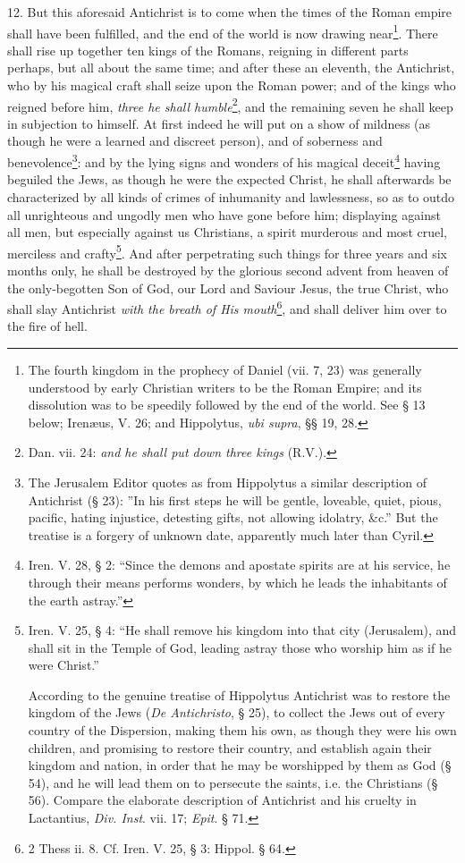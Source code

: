 12. But this aforesaid Antichrist is to come when the times of the Roman empire shall have been fulfilled, and the end of the world is now drawing near\footnote{The fourth kingdom in the prophecy of Daniel (vii. 7, 23) was generally understood by early Christian writers to be the Roman Empire; and its dissolution was to be speedily followed by the end of the world. See § 13 below; Irenæus, V. 26; and Hippolytus, \emph{ubi supra}, §§ 19, 28.}. There shall rise up together ten kings of the Romans, reigning in different parts perhaps, but all about the same time; and after these an eleventh, the Antichrist, who by his magical craft shall seize upon the Roman power; and of the kings who reigned before him, \emph{three he shall humble}\footnote{Dan. vii. 24: \emph{and he shall put down three kings} (R.V.).}, and the remaining seven he shall keep in subjection to himself. At first indeed he will put on a show of mildness (as though he were a learned and discreet person), and of soberness and benevolence\footnote{The Jerusalem Editor quotes as from Hippolytus a similar description of Antichrist (§ 23): ”In his first steps he will be gentle, loveable, quiet, pious, pacific, hating injustice, detesting gifts, not allowing idolatry, \&c.” But the treatise is a forgery of unknown date, apparently much later than Cyril.}: and by the lying signs and wonders of his magical deceit\footnote{Iren. V. 28, § 2: “Since the demons and apostate spirits are at his service, he through their means performs wonders, by which he leads the inhabitants of the earth astray.”} having beguiled the Jews, as though he were the expected Christ, he shall afterwards be characterized by all kinds of crimes of inhumanity and lawlessness, so as to outdo all unrighteous and ungodly men who have gone before him; displaying against all men, but especially against us Christians, a spirit murderous and most cruel, merciless and crafty\footnote{Iren. V. 25, § 4: “He shall remove his kingdom into that city (Jerusalem), and shall sit in the Temple of God, leading astray those who worship him as if he were Christ.” \par According to the genuine treatise of Hippolytus Antichrist was to restore the kingdom of the Jews (\emph{De Antichristo}, § 25), to collect the Jews out of every country of the Dispersion, making them his own, as though they were his own children, and promising to restore their country, and establish again their kingdom and nation, in order that he may be worshipped by them as God (§ 54), and he will lead them on to persecute the saints, i.e. the Christians (§ 56). Compare the elaborate description of Antichrist and his cruelty in Lactantius, \emph{Div. Inst}. vii. 17; \emph{Epit}. § 71.}. And after perpetrating such things for three years and six months only, he shall be destroyed by the glorious second advent from heaven of the only-begotten Son of God, our Lord and Saviour Jesus, the true Christ, who shall slay Antichrist \emph{with the breath of His mouth}\footnote{2 Thess ii. 8. Cf. Iren. V. 25, § 3: Hippol. § 64.}, and shall deliver him over to the fire of hell.

